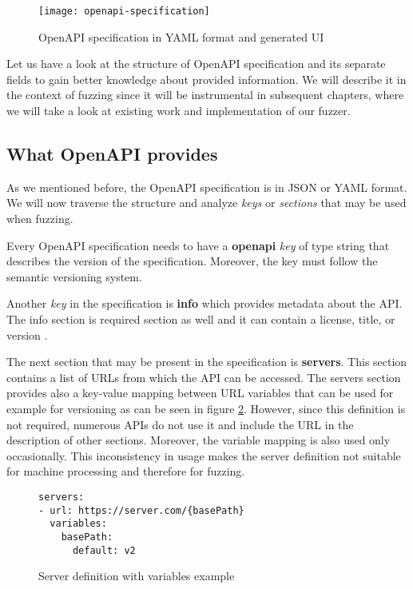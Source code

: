 \begin{figure}[h]
  \texttt{[image: openapi-specification]}
  \caption{OpenAPI specification in YAML format and generated UI}
  \label{fig:openapi-specification}
\end{figure}

Let us have a look at the structure of OpenAPI specification and its separate fields to gain better knowledge about provided information. We will describe it in the context of fuzzing since it will be instrumental in subsequent chapters, where we will take a look at existing work and implementation of our fuzzer.

\subsection{What OpenAPI provides}
As we mentioned before, the OpenAPI specification is in JSON or YAML format. We will now traverse the structure and analyze \textit{keys} or \textit{sections} that may be used when fuzzing.

Every OpenAPI specification needs to have a \textbf{openapi} \textit{key} of type string that describes the version of the specification. Moreover, the key must follow the semantic versioning system.

Another \textit{key} in the specification is \textbf{info} which provides metadata about the API. The info section is required section as well and it can contain a license, title, or version \cite{openapi2020github}.

The next section that may be present in the specification is \textbf{servers}. This section contains a list of URLs from which the API can be accessed. The servers section provides also a key-value mapping between URL variables that can be used for example for versioning as can be seen in figure \ref{fig:Server definition with variables}. However, since this definition is not required, numerous APIs do not use it and include the URL in the description of other sections. Moreover, the variable mapping is also used only occasionally. This inconsistency in usage makes the server definition not suitable for machine processing and therefore for fuzzing.

\begin{figure}[H]
  \begin{verbatim}
servers:
- url: https://server.com/{basePath}
  variables:
    basePath:
      default: v2
  \end{verbatim}
  \caption{Server definition with variables example}
  \label{fig:Server definition with variables}
\end{figure}

